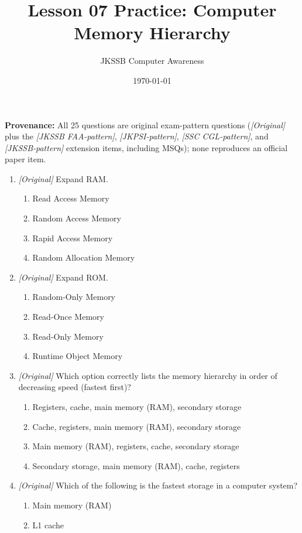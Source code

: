 \documentclass[11pt]{article}
\title{Lesson 07 Practice: Computer Memory Hierarchy}
\author{JKSSB Computer Awareness}
\date{\today}
\begin{document}
\maketitle
\noindent\textbf{Provenance:} All 25 questions are original exam-pattern questions (\textit{[Original]} plus the \textit{[JKSSB FAA-pattern]}, \textit{[JKPSI-pattern]}, \textit{[SSC CGL-pattern]}, and \textit{[JKSSB-pattern]} extension items, including MSQs); none reproduces an official paper item.

\begin{enumerate}[label=\textbf{Q\arabic*.}, leftmargin=*]
\item \textit{[Original]} Expand RAM.
  \begin{enumerate}[label=\Alph*.]
    \item Read Access Memory
    \item Random Access Memory
    \item Rapid Access Memory
    \item Random Allocation Memory
  \end{enumerate}
\item \textit{[Original]} Expand ROM.
  \begin{enumerate}[label=\Alph*.]
    \item Random-Only Memory
    \item Read-Once Memory
    \item Read-Only Memory
    \item Runtime Object Memory
  \end{enumerate}
\item \textit{[Original]} Which option correctly lists the memory hierarchy
  in order of decreasing speed (fastest first)?
  \begin{enumerate}[label=\Alph*.]
    \item Registers, cache, main memory (RAM), secondary storage
    \item Cache, registers, main memory (RAM), secondary storage
    \item Main memory (RAM), registers, cache, secondary storage
    \item Secondary storage, main memory (RAM), cache, registers
  \end{enumerate}
\item \textit{[Original]} Which of the following is the fastest storage in a
  computer system?
  \begin{enumerate}[label=\Alph*.]
    \item Main memory (RAM)
    \item L1 cache

\end{enumerate}
\end{enumerate}
\end{document}
